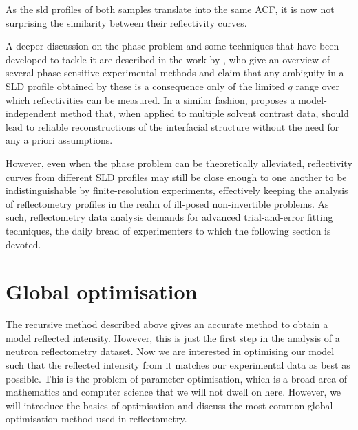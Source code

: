 \documentclass[
 reprint,
 superscriptaddress,
 amsmath,amssymb,
 aps,
]{revtex4-1}
\begin{document}
\noindent As the sld profiles of both samples translate into the same ACF,
it is now not surprising the similarity between their reflectivity curves.

A deeper discussion on the phase problem and some techniques
that have been developed to tackle it are described in 
the work by \cite[Majkrzak et al.]{majkrzak_phase_2003}, who give an overview of several
phase-sensitive experimental methods and claim that any ambiguity in a SLD profile obtained
by these is a consequence only of the limited $q$ range over which reflectivities can be measured.
In a similar fashion, \cite{koutsioubas_model_2019} proposes a model-independent method that,
when applied to multiple solvent contrast data, should lead to reliable
reconstructions of the interfacial structure without the need for any a priori assumptions.

However, even when the phase problem can be theoretically alleviated, reflectivity curves
from different SLD profiles may still be close enough to one another to be indistinguishable
by finite-resolution experiments, effectively keeping the analysis of reflectometry profiles
in the realm of ill-posed non-invertible problems. As such, reflectometry data analysis demands
for advanced trial-and-error fitting techniques, the daily bread of experimenters to
which the following section is devoted.



\section{Global optimisation}
The recursive method described above gives an accurate method to obtain a model reflected intensity. 
However, this is just the first step in the analysis of a neutron reflectometry dataset. 
Now we are interested in optimising our model such that the reflected intensity from it matches our experimental data as best as possible. 
This is the problem of parameter optimisation, which is a broad area of mathematics and computer science that we will not dwell on here. 
However, we will introduce the basics of optimisation and discuss the most common global optimisation method used in reflectometry. 
\end{document}
